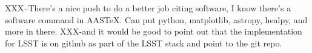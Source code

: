 \documentclass[12pt,aas_macros]{article}
\theoremstyle{definition}
\begin{document}
\newpage

XXX--There's a nice push to do a better job citing software, I know there's a software command in AASTeX. Can put python, matplotlib, astropy, healpy, and more in there.
XXX-and it would be good to point out that the implementation for LSST is on github as part of the LSST stack and point to the git repo.



%

\end{document}
